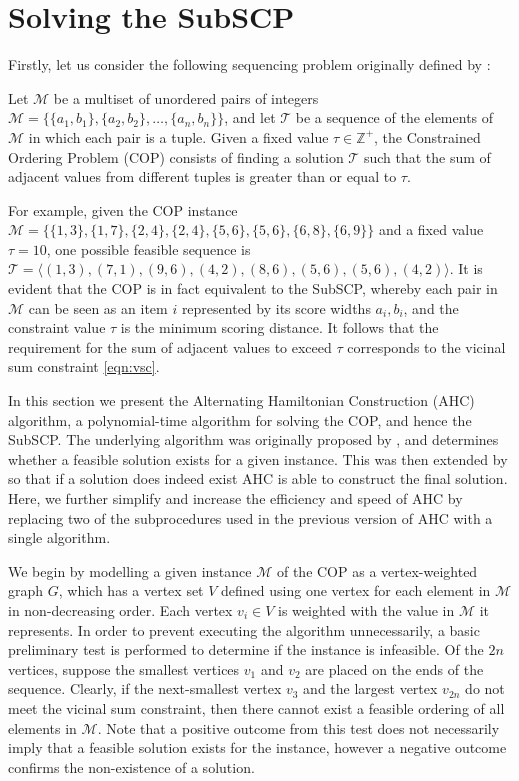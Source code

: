\documentclass[authoryear]{elsarticle}
\begin{document}
\section{Solving the SubSCP}
\label{sec:ahc}
\noindent Firstly, let us consider the following sequencing problem originally defined by \citet{hawa2018}:

\begin{definition} %
	\label{defn:cop}
	Let $\mathcal{M}$ be a multiset of unordered pairs of integers $\mathcal{M} = \{\{a_1, b_1\}, \{a_2, b_2\},\dotsc,\{a_n, b_n\}\}$, and let $\mathcal{T}$ be a sequence of the elements of $\mathcal{M}$ in which each pair is a tuple. Given a fixed value $\tau \in \mathbb{Z}^+$, the Constrained Ordering Problem (COP) consists of finding a solution $\mathcal{T}$ such that the sum of adjacent values from different tuples is greater than or equal to $\tau$.
\end{definition}

\noindent For example, given the COP instance $\mathcal{M} = \{\{1,3\}, \{1,7\}, \{2,4\}, \{2,4\}, \{5,6\}, \{5,6\}, \{6,8\}, \{6,9\} \}$ and a fixed value $\tau = 10$, one possible feasible sequence is $\mathcal{T} = \langle(1,3), (7,1), (9,6), (4,2), (8,6), (5,6), (5,6), (4,2)\rangle$. It is evident that the COP is in fact equivalent to the SubSCP, whereby each pair in $\mathcal{M}$ can be seen as an item $i$ represented by its score widths $a_i, b_i$, and the constraint value $\tau$ is the minimum scoring distance. It follows that the requirement for the sum of adjacent values to exceed $\tau$ corresponds to the vicinal sum constraint \eqref{eqn:vsc}.

In this section we present the Alternating Hamiltonian Construction (AHC) algorithm, a polynomial-time algorithm for solving the COP, and hence the SubSCP. The underlying algorithm was originally proposed by \citet{becker2010}, and determines whether a feasible solution exists for a given instance. This was then extended by \citet{hawa2018} so that if a solution does indeed exist AHC is able to construct the final solution. Here, we further simplify and increase the efficiency and speed of AHC by replacing two of the subprocedures used in the previous version of AHC with a single algorithm.

We begin by modelling a given instance $\mathcal{M}$ of the COP as a vertex-weighted graph $G$, which has a vertex set $V$ defined using one vertex for each element in $\mathcal{M}$ in non-decreasing order. Each vertex $v_i \in V$ is weighted with the value in $\mathcal{M}$ it represents. In order to prevent executing the algorithm unnecessarily, a basic preliminary test is performed to determine if the instance is infeasible. Of the $2n$ vertices, suppose the smallest vertices $v_1$ and $v_2$ are placed on the ends of the sequence. Clearly, if the next-smallest vertex $v_3$ and the largest vertex $v_{2n}$ do not meet the vicinal sum constraint, then there cannot exist a feasible ordering of all elements in $\mathcal{M}$. Note that a positive outcome from this test does not necessarily imply that a feasible solution exists for the instance, however a negative outcome confirms the non-existence of a solution.
\end{document}
